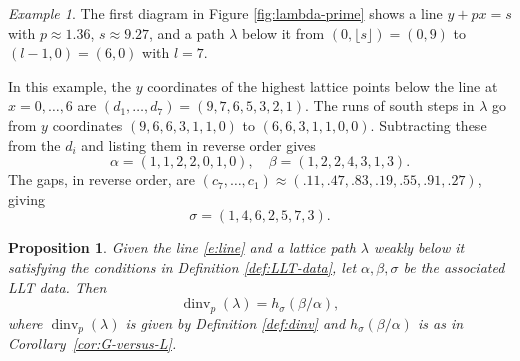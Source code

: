 \documentclass[12pt]{amsart}
\newtheorem{prop}[thm]{Proposition}
\theoremstyle{definition}
\theoremstyle{remark}
\newtheorem{example}[thm]{Example}
\DeclareMathOperator{\dinv}{dinv}
\begin{document}
\begin{example}\label{ex:LLT-data}
The first diagram in Figure \ref{fig:lambda-prime} shows a line $y +
px = s$ with $p\approx 1.36$, $s\approx 9.27$, and a path $\lambda $
below it from $(0,\lfloor s \rfloor) = (0,9)$ to $(l-1,0) = (6,0)$
with $l = 7$.

In this example, the $y$ coordinates of the highest lattice points
below the line at $x = 0,\ldots,6$ are $(d_{1},\ldots,d_{7}) =
(9,7,6,5,3,2,1)$.  The runs of south steps in $\lambda $ go from $y$
coordinates $(9,6,6,3,1,1,0)$ to $(6,6,3,1,1,0,0)$.  Subtracting these
from the $d_{i}$ and listing them in reverse order gives
\begin{equation}\label{e:alpha-beta-example}
\alpha = (1,1,2,2,0,1,0),\quad \beta = (1,2,2,4,3,1,3).
\end{equation}
The gaps, in reverse order, are $(c_{7},\ldots,c_{1})\approx (.11,
.47, .83, .19, .55, .91, .27)$, giving
\begin{equation}\label{e:sigma-example}
\sigma = (1,4,6,2,5,7,3).
\end{equation}
\end{example}


\begin{prop}\label{prop:h=dinv}
Given the line \eqref{e:line} and a lattice path $\lambda $ weakly
below it satisfying the conditions in Definition \ref{def:LLT-data},
let $\alpha ,\beta, \sigma $ be the associated LLT data. Then
\begin{equation}\label{e:h=dinv}
\dinv _{p}(\lambda ) = h_{\sigma }(\beta /\alpha ),
\end{equation}
where $\dinv _{p}(\lambda )$ is given by Definition \ref{def:dinv} and
$h_{\sigma }(\beta /\alpha )$ is as in Corollary~\ref{cor:G-versus-L}.
\end{prop}
\end{document}
